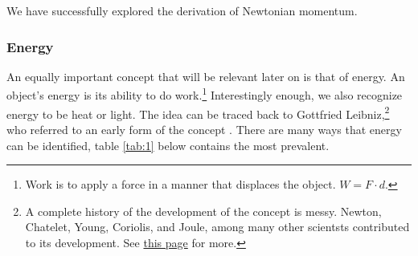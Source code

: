 \documentclass{article}
\begin{document}
                We have successfully explored the derivation of Newtonian momentum.

            \subsubsection{Energy}
                An equally important concept that will be relevant later on is that of energy. An object's energy is its ability to do work.\footnote{Work is to apply a force in a manner that displaces the object. $W = F \cdot d$.}
                Interestingly enough, we also recognize energy to be heat or light. The idea can be traced back to Gottfried Leibniz,\footnote{A complete history of the development of the concept is messy. Newton, Chatelet, Young, Coriolis, and Joule, among many other scientsts contributed to its development. See \href{https://spark.iop.org/history-concept-energy-and-work}{this page} for more.} 
                who referred to an early form of the concept \cite{Smith}.
                There are many ways that energy can be identified, table \ref{tab:1} below contains the most prevalent.
\end{document}

